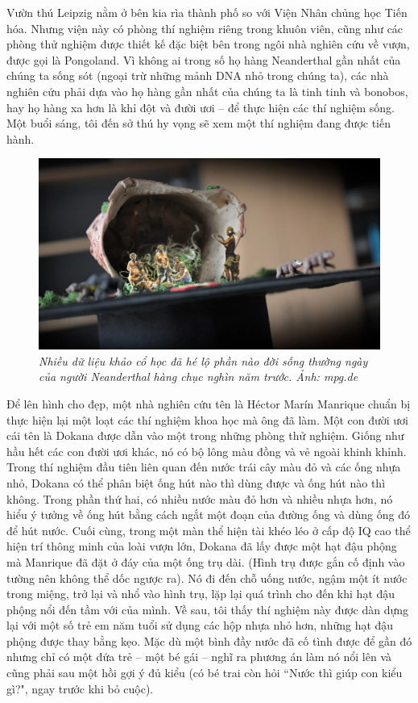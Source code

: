 \begin{multicols}{2}
	Vườn thú Leipzig nằm ở bên kia rìa thành phố so với Viện Nhân chủng học Tiến hóa. Nhưng viện này có phòng thí nghiệm riêng trong khuôn viên, cũng như các phòng thử nghiệm được thiết kế đặc biệt bên trong ngôi nhà nghiên cứu về vượn, được gọi là Pongoland. Vì không ai trong số họ hàng Neanderthal gần nhất của chúng ta sống sót (ngoại trừ những mảnh DNA nhỏ trong chúng ta), các nhà nghiên cứu phải dựa vào họ hàng gần nhất của chúng ta là tinh tinh và bonobos, hay họ hàng xa hơn là khỉ đột và đười ươi -- để thực hiện các thí nghiệm sống. Một buổi sáng, tôi đến sở thú hy vọng sẽ xem một thí nghiệm đang được tiến hành.
	\begin{figure}[H]
		\vspace*{-5pt}
		\centering
		\captionsetup{labelformat= empty, justification=centering}
		\includegraphics[width= 1\linewidth]{4}
		\caption{\small\textit{\color{timhieukhoahoc}Nhiều dữ liệu khảo cổ học đã hé lộ phần nào đời sống thường ngày của người Neanderthal hàng chục nghìn năm trước. Ảnh: mpg.de}}
		\vspace*{-10pt}
	\end{figure}
	Để lên hình cho đẹp, một nhà nghiên cứu tên là Héctor Marín Manrique chuẩn bị thực hiện lại một loạt các thí nghiệm khoa học mà ông đã làm. Một con đười ươi cái tên là Dokana được dẫn vào một trong những phòng thử nghiệm. Giống như hầu hết các con đười ươi khác, nó có bộ lông màu đồng và vẻ ngoài khinh khỉnh. Trong thí nghiệm đầu tiên liên quan đến nước trái cây màu đỏ và các ống nhựa nhỏ, Dokana có thể phân biệt ống hút nào thì dùng được và ống hút nào thì không. Trong phần thứ hai, có nhiều nước màu đỏ hơn và nhiều nhựa hơn, nó hiểu ý tưởng về ống hút bằng cách ngắt một đoạn của đường ống và dùng ống đó để hút nước. Cuối cùng, trong một màn thể hiện tài khéo léo ở cấp độ IQ cao thể hiện trí thông minh của loài vượn lớn, Dokana đã lấy được một hạt đậu phộng mà Manrique đã đặt ở đáy của một ống trụ dài. (Hình trụ được gắn cố định vào tường nên không thể dốc ngược ra). Nó đi đến chỗ uống nước, ngậm một ít nước trong miệng, trở lại và nhổ vào hình trụ, lặp lại quá trình cho đến khi hạt đậu phộng nổi đến tầm với của mình. Về sau, tôi thấy thí nghiệm này được dàn dựng lại với một số trẻ em năm tuổi sử dụng các hộp nhựa nhỏ hơn, những hạt đậu phộng được thay bằng kẹo. Mặc dù một bình đầy nước đã cố tình được để gần đó nhưng chỉ có một đứa trẻ -- một bé gái -- nghĩ ra phương án làm nó nổi lên và cũng phải sau một hồi gợi ý đủ kiểu (có bé trai còn hỏi ``Nước thì giúp con kiểu gì?", ngay trước khi bỏ cuộc).

\end{multicols}
